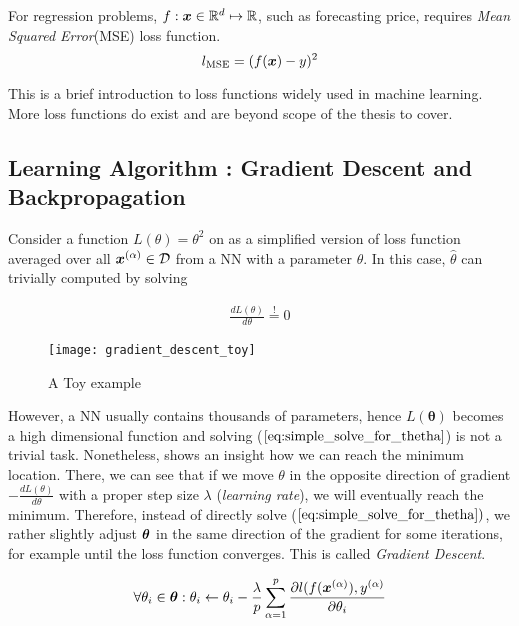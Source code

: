 For regression problems, $ f : \boldsymbol{x} \in \mathbb{R}^d  \mapsto \mathbb{R}$, such as forecasting price, requires \textit{Mean Squared Error}(MSE) loss function.
$$
l_{\text{MSE}} = (f(\boldsymbol{x}) - y)^2
$$

This is a brief introduction to loss functions widely used in machine learning. More loss functions do exist and are beyond scope of the thesis to cover.

\subsection{Learning Algorithm : Gradient Descent and Backpropagation}
Consider a  function $L(\theta) = \theta^2$ on \addfigure{\ref{fig:gradent_descent_toy}} as a simplified version of loss function averaged over all $\xa \in \mathcal{D}$  from a NN with a parameter $\theta$. In this case, $\hat{\theta}$ can trivially computed by solving

\begin{align}
	\frac{d L(\theta)}{d \theta}  \stackrel{!}{=} 0
	\label{eq:simple_solve_for_thetha}
\end{align}

\begin{figure}[ht!]
    \begin{center}
		\texttt{[image: gradient\_descent\_toy]}
		\caption[]{A Toy example}
		\label{fig:gradent_descent_toy}
	\end{center}
\end{figure}

However, a NN usually contains thousands of parameters, hence $L(\boldsymbol{\theta})$ becomes a high dimensional function and solving ($\ref{eq:simple_solve_for_thetha}$) is not a trivial task. Nonetheless, \addfigure{\ref{fig:gradent_descent_toy}} shows an insight how we can reach the minimum location. There, we can see that if we move $\theta$ in the opposite direction of gradient $	-\frac{d L(\theta)}{d \theta}$ with a proper step size $\lambda$ (\textit{learning rate}), we will eventually reach the minimum. Therefore, instead of directly solve ($\ref{eq:simple_solve_for_thetha})$, we rather slightly adjust $\boldsymbol{\theta}$ in the same direction of the gradient for some iterations, for example until the loss function converges. This is called \textit{Gradient Descent}.

\begin{align*}
\forall \theta_i \in \btheta :  \theta_i \leftarrow \theta_i - \frac{\lambda}{p} \sum_{\alpha=1}^{p} \frac{\partial l(f(\xa), \ya }{\partial \theta_i } 
\label{eq:gradient_update}
\end{align*}


